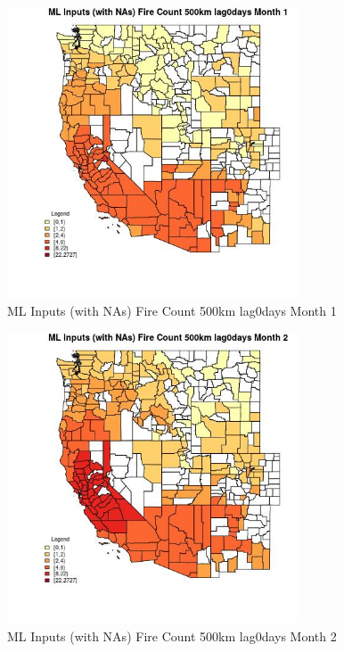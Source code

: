 \begin{figure} 
\centering  
\includegraphics[width=0.77\textwidth]{Code_Outputs/Report_ML_input_PM25_Step4_part_f_de_duplicated_aves_prioritize_24hr_obswNAs_CountyFire_Count_500km_lag0daysmedianMonth1.jpg} 
\caption{\label{fig:Report_ML_input_PM25_Step4_part_f_de_duplicated_aves_prioritize_24hr_obswNAsCountyFire_Count_500km_lag0daysmedianMonth1}ML Inputs (with NAs) Fire Count 500km lag0days Month 1} 
\end{figure} 
 

\begin{figure} 
\centering  
\includegraphics[width=0.77\textwidth]{Code_Outputs/Report_ML_input_PM25_Step4_part_f_de_duplicated_aves_prioritize_24hr_obswNAs_CountyFire_Count_500km_lag0daysmedianMonth2.jpg} 
\caption{\label{fig:Report_ML_input_PM25_Step4_part_f_de_duplicated_aves_prioritize_24hr_obswNAsCountyFire_Count_500km_lag0daysmedianMonth2}ML Inputs (with NAs) Fire Count 500km lag0days Month 2} 
\end{figure} 
 

